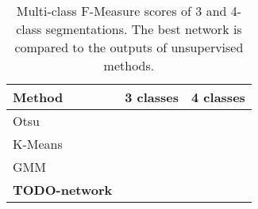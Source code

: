 \begin {table}
	\centering
	\begin {tabular}[!ht]{|l|c|c|}
		\hline
		\textbf{Method}& \textbf{3 classes}& \textbf{4 classes}\\ \hline
		Otsu& & \\ \hline
		K-Means& & \\ \hline
		GMM& & \\ \hline
		\textbf{TODO-network}& & \\ \hline
	\end {tabular}
\caption[]{Multi-class F-Measure scores of 3 and 4-class segmentations. The best network is compared to the outputs of unsupervised methods.}
\end {table}